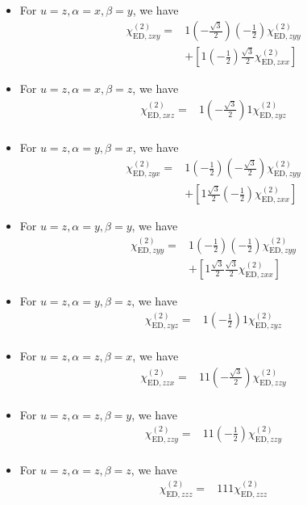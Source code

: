 \documentclass[UTF8,10pt,a4paper]{article}
\begin{document}
\begin{itemize}
\begin{align}
\end{align}\normalsize
\item For $u=z,\alpha=x,\beta=y$, we have
\small\begin{align}
\nonumber\chi_{\text{ED},zxy}^{(2)}=&1\left(-\frac{\sqrt{3}}{2}\right)\left(-\frac{1}{2}\right)\chi_{\text{ED},zyy}^{(2)}\\
&+\left[1\left(-\frac{1}{2}\right)\frac{\sqrt{3}}{2}\chi_{\text{ED},zxx}^{(2)}\right]
\end{align}\normalsize
\item For $u=z,\alpha=x,\beta=z$, we have
\small\begin{align}
\nonumber\chi_{\text{ED},zxz}^{(2)}=&1\left(-\frac{\sqrt{3}}{2}\right)1\chi_{\text{ED},zyz}^{(2)}\\
&
\end{align}\normalsize
\item For $u=z,\alpha=y,\beta=x$, we have
\small\begin{align}
\nonumber\chi_{\text{ED},zyx}^{(2)}=&1\left(-\frac{1}{2}\right)\left(-\frac{\sqrt{3}}{2}\right)\chi_{\text{ED},zyy}^{(2)}\\
&+\left[1\frac{\sqrt{3}}{2}\left(-\frac{1}{2}\right)\chi_{\text{ED},zxx}^{(2)}\right]
\end{align}\normalsize
\item For $u=z,\alpha=y,\beta=y$, we have
\small\begin{align}
\nonumber\chi_{\text{ED},zyy}^{(2)}=&1\left(-\frac{1}{2}\right)\left(-\frac{1}{2}\right)\chi_{\text{ED},zyy}^{(2)}\\
&+\left[1\frac{\sqrt{3}}{2}\frac{\sqrt{3}}{2}\chi_{\text{ED},zxx}^{(2)}\right]
\end{align}\normalsize
\item For $u=z,\alpha=y,\beta=z$, we have
\small\begin{align}
\nonumber\chi_{\text{ED},zyz}^{(2)}=&1\left(-\frac{1}{2}\right)1\chi_{\text{ED},zyz}^{(2)}\\
&
\end{align}\normalsize
\item For $u=z,\alpha=z,\beta=x$, we have
\small\begin{align}
\nonumber\chi_{\text{ED},zzx}^{(2)}=&11\left(-\frac{\sqrt{3}}{2}\right)\chi_{\text{ED},zzy}^{(2)}\\
&
\end{align}\normalsize
\item For $u=z,\alpha=z,\beta=y$, we have
\small\begin{align}
\nonumber\chi_{\text{ED},zzy}^{(2)}=&11\left(-\frac{1}{2}\right)\chi_{\text{ED},zzy}^{(2)}\\
&
\end{align}\normalsize
\item For $u=z,\alpha=z,\beta=z$, we have
\small\begin{align}
\nonumber\chi_{\text{ED},zzz}^{(2)}=&111\chi_{\text{ED},zzz}^{(2)}\\
&
\end{align}\normalsize
\end{itemize}
\end{document}
